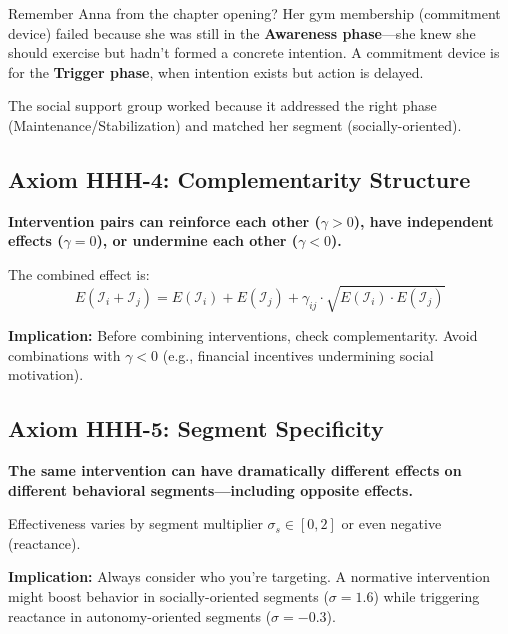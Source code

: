 \begin{tcolorbox}[colback=yellow!5!white, colframe=yellow!75!black,
    title=Example: Anna's Misaligned Intervention]
Remember Anna from the chapter opening? Her gym membership (commitment device) failed because she was still in the \textbf{Awareness phase}---she knew she should exercise but hadn't formed a concrete intention. A commitment device is for the \textbf{Trigger phase}, when intention exists but action is delayed.

The social support group worked because it addressed the right phase (Maintenance/Stabilization) and matched her segment (socially-oriented).
\end{tcolorbox}

\subsection{Axiom HHH-4: Complementarity Structure}

\begin{tcolorbox}[colback=gray!5!white, colframe=gray!75!black,
    title=Axiom HHH-4: Complementarity Structure]
\textbf{Intervention pairs can reinforce each other ($\gamma > 0$), have independent effects ($\gamma = 0$), or undermine each other ($\gamma < 0$).}

The combined effect is:
\begin{equation}
E(\mathcal{I}_i + \mathcal{I}_j) = E(\mathcal{I}_i) + E(\mathcal{I}_j) + \gamma_{ij} \cdot \sqrt{E(\mathcal{I}_i) \cdot E(\mathcal{I}_j)}
\end{equation}

\textbf{Implication:} Before combining interventions, check complementarity. Avoid combinations with $\gamma < 0$ (e.g., financial incentives undermining social motivation).
\end{tcolorbox}

\subsection{Axiom HHH-5: Segment Specificity}

\begin{tcolorbox}[colback=gray!5!white, colframe=gray!75!black,
    title=Axiom HHH-5: Segment Specificity]
\textbf{The same intervention can have dramatically different effects on different behavioral segments---including opposite effects.}

Effectiveness varies by segment multiplier $\sigma_s \in [0, 2]$ or even negative (reactance).

\textbf{Implication:} Always consider who you're targeting. A normative intervention might boost behavior in socially-oriented segments ($\sigma = 1.6$) while triggering reactance in autonomy-oriented segments ($\sigma = -0.3$).
\end{tcolorbox}


